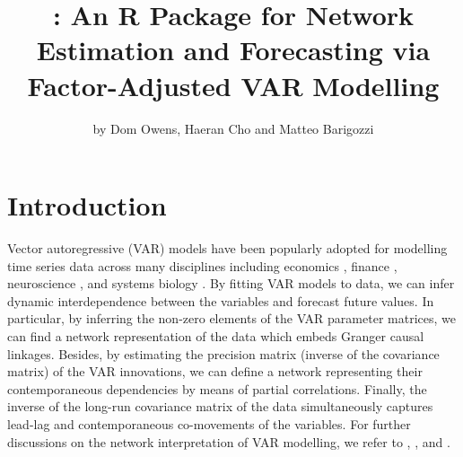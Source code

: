
\title{: An R Package for Network Estimation and Forecasting via Factor-Adjusted VAR Modelling}
\author{by Dom Owens, Haeran Cho and Matteo Barigozzi}

\maketitle


\section{Introduction}

Vector autoregressive (VAR) models have been popularly adopted for modelling time series data across many disciplines including economics \citep{koop2013forecasting}, finance \citep{barigozzi2019nets}, neuroscience \citep{kirch2015eeg}, and systems biology \citep{shojaie2010discovering}.
By fitting VAR models to data, we can infer dynamic interdependence between the variables and forecast future values.
In particular, by inferring the non-zero elements of the VAR parameter matrices, we can find a network representation of the data which embeds Granger causal linkages.
Besides, by estimating the precision matrix (inverse of the covariance matrix) of the VAR innovations, we can define a network representing their contemporaneous dependencies by means of partial correlations.
Finally, the inverse of the long-run covariance matrix of the data simultaneously captures lead-lag and contemporaneous co-movements of the variables. 
For further discussions on the network interpretation of VAR modelling, we refer to
\cite{dahlhaus2000graphical}, \cite{eichler2007granger}, \cite{billio2012econometric} and \cite{barigozzi2019nets}.

